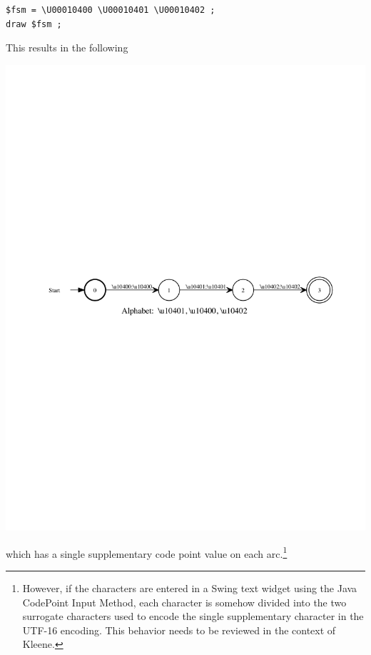 \begin{Verbatim}
$fsm = \U00010400 \U00010401 \U00010402 ;
draw $fsm ;
\end{Verbatim}

\noindent
This results in the following \fsm


\begin{center}
\includegraphics[width=135mm]{images/desalph.pdf}
\end{center}

\noindent
which has a single supplementary code point value on each arc.\footnote{However, if the
characters are entered in a Swing text widget using the Java CodePoint Input Method, each
character is somehow divided into the two  surrogate characters used to encode
the single supplementary character in the UTF-16 encoding.  This behavior needs to be
reviewed in the context of Kleene.}

